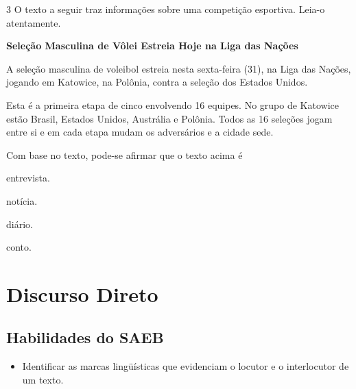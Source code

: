 \pagebreak
\num{3} O texto a seguir traz informações sobre uma competição esportiva. 
Leia-o atentamente.

\begin{myquote}
\textbf{Seleção Masculina de Vôlei Estreia Hoje na Liga das Nações}

A seleção masculina de voleibol estreia nesta sexta-feira
(31), na Liga das Nações, jogando em Katowice, na Polônia, contra a 
seleção dos Estados Unidos.

Esta é a primeira etapa de cinco envolvendo 16 equipes. No grupo de 
Katowice estão Brasil, Estados Unidos, Austrália e Polônia. Todos as 16
seleções jogam entre si e em cada etapa mudam os adversários e a cidade 
sede.

\end{myquote}

Com base no texto, pode-se afirmar que o texto
acima é 

\begin{escolha}
\item entrevista.

\item notícia.

\item diário.

\item conto.
\end{escolha}

\chapter{Discurso Direto}


\section*{Habilidades do SAEB}

\begin{itemize}

\item Identificar as marcas lingüísticas que evidenciam o locutor e o interlocutor de um texto.

\end{itemize}


